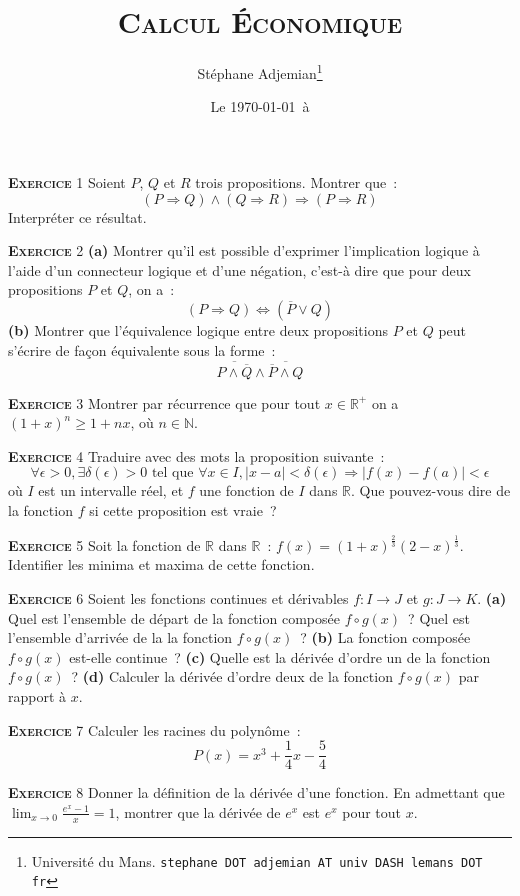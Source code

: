 \documentclass[10pt,a4paper,notitlepage]{article}
\newcommand{\exercice}[1]{\textsc{\textbf{Exercice}} #1}
\begin{document}
\title{\textsc{Calcul Économique}}
\author{Stéphane Adjemian\thanks{Université du Mans. \texttt{stephane DOT adjemian AT univ DASH lemans DOT fr}}}
\date{Le \today\ à \thistime}

\maketitle

\exercice{1} Soient $P$, $Q$ et $R$ trois propositions. Montrer que :
	\[
		(P \Rightarrow Q) \land (Q \Rightarrow R) \Rightarrow (P \Rightarrow R)
	\]
	Interpréter ce résultat.
	
\bigskip

\exercice{2} \textbf{(a)} Montrer qu'il est possible d'exprimer l'implication
logique à l'aide d'un connecteur logique et d'une négation, c'est-à
dire que pour deux propositions $P$ et $Q$, on a :
\[
  (P \Rightarrow Q) \Leftrightarrow (\overline{P} \lor Q)
\]
\textbf{(b)} Montrer que l'équivalence logique entre deux propositions
$P$ et $Q$ peut s'écrire de façon équivalente sous la forme :
\[
  \overline{P \land \overline{Q}} \land \overline{\overline{P} \land Q}
\]

\bigskip

\exercice{3} Montrer par récurrence que pour tout $x\in \mathbb R^+$ on a $(1+x)^n \geq 1+nx$, où $n\in \mathbb N$.

\bigskip

\exercice{4} Traduire avec des mots la proposition suivante :
\[
\forall \epsilon>0, \exists \delta(\epsilon)>0 \text{ tel que } \forall x \in I,  |x-a|<\delta(\epsilon) \Rightarrow |f(x)-f(a)|<\epsilon   
\]
où $I$ est un intervalle réel, et $f$ une fonction de $I$ dans
$\mathbb R$. Que pouvez-vous dire de la fonction $f$ si cette
proposition est vraie ?

\bigskip

\exercice{5} Soit la fonction de $\mathbb R$ dans $\mathbb R$ :
$f(x) = (1+x)^{\frac{2}{3}}(2-x)^{\frac{1}{3}}$. Identifier les minima
et maxima de cette fonction.
 
\bigskip

\exercice{6} Soient les fonctions continues et dérivables
$f: I\rightarrow J$ et $g: J\rightarrow K$. \textbf{(a)} Quel est
l'ensemble de départ de la fonction composée $f \circ g (x)$ ? Quel
est l'ensemble d'arrivée de la la fonction $f \circ g (x)$ ?
\textbf{(b)} La fonction composée $f \circ g (x)$ est-elle continue ?
\textbf{(c)} Quelle est la dérivée d'ordre un de la fonction
$f \circ g (x)$ ? \textbf{(d)} Calculer la dérivée d'ordre deux de la
fonction $f \circ g (x)$ par rapport à $x$.

\bigskip

\exercice{7} Calculer les racines du polynôme :
\[
P(x) = x^3 + \frac{1}{4}x - \frac{5}{4}
\]    

\bigskip

\exercice{8} Donner la définition de la dérivée d'une fonction. En admettant que $\lim_{x \rightarrow 0}\frac{e^x-1}{x} = 1$, montrer que la dérivée de $e^x$ est $e^x$ pour tout $x$.
\end{document}

